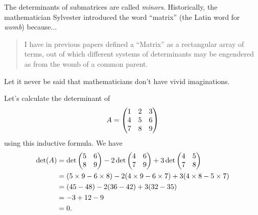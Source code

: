\documentclass{article}
\begin{document}
\begin{Remark}
The determinants of submatrices are called {\em
minors}. Historically, the mathematician Sylvester introduced the
word ``matrix'' (the Latin word for {\em womb}) because...


\begin{quotation}
I have in previous papers defined a ``Matrix'' as a rectangular array of
terms, out of which different systems of determinants may be
engendered as from the womb of a common parent.
\end{quotation}


Let it never be said that mathematicians don't have vivid
imaginations.


\end{Remark}
\begin{Example}
Let's calculate the determinant of \[A=\begin{pmatrix} 1 & 2 & 3 \\ 4 & 5 & 6
\\ 7 & 8 & 9\end{pmatrix}\] using this inductive formula. We have
\begin{align*}
\det(A)&=\det\begin{pmatrix} 5 & 6 \\ 8 & 9\end{pmatrix}-2\det\begin{pmatrix} 4 & 6 \\ 7 &
9\end{pmatrix}+3\det\begin{pmatrix} 4 & 5 \\ 7 & 8 \end{pmatrix}\\
&=(5\times 9-6\times 8)-2(4\times 9-6\times 7)+3(4\times 8-5\times 7)\\
&=(45-48)-2(36-42)+3(32-35)\\
&=-3+12-9\\
&=0.
\end{align*}


\end{Example}
\end{document}
